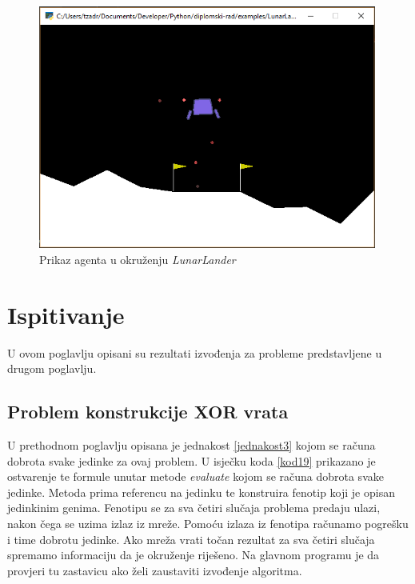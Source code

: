 \documentclass[times, utf8, diplomski, numeric]{fer}
\begin{document}
\begin{figure}
  \centering
  \includegraphics[height=8cm]{slika11}
  \caption{Prikaz agenta u okruženju \textit{LunarLander}}
  \label{slika11}
\end{figure}

\chapter{Ispitivanje}
U ovom poglavlju opisani su rezultati izvođenja za probleme predstavljene u drugom poglavlju.

\section{Problem konstrukcije XOR vrata}
U prethodnom poglavlju opisana je jednakost \ref{jednakost3} kojom se računa dobrota svake jedinke za ovaj problem. U isječku koda \ref{kod19} prikazano je ostvarenje te formule unutar metode \textit{evaluate} kojom se računa dobrota svake jedinke. Metoda prima referencu na jedinku te konstruira fenotip koji je opisan jedinkinim genima. Fenotipu se za sva četiri slučaja problema predaju ulazi, nakon čega se uzima izlaz iz mreže. Pomoću izlaza iz fenotipa računamo pogrešku i time dobrotu jedinke. Ako mreža vrati točan rezultat za sva četiri slučaja spremamo informaciju da je okruženje riješeno. Na glavnom programu je da provjeri tu zastavicu ako želi zaustaviti izvođenje algoritma.
\end{document}
